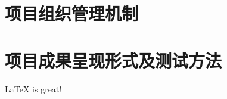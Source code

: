 \documentclass{icsartcn}
\begin{document}
\section{项目组织管理机制}

\section{项目成果呈现形式及测试方法}



\LaTeX\cite{liu2009greencloud} is great!
\appendix


\printindex{}
\end{document}
